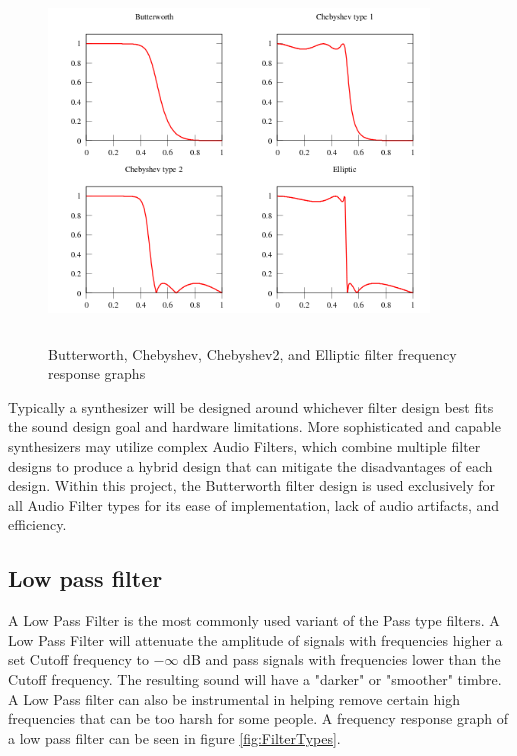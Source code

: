 \documentclass[a4paper,12pt]{report}
\begin{document}
\begin{figure}[h]
    \centering
    \includegraphics[width=0.9\textwidth,height=9.5cm]{FilterDesigns.png}
    \caption{Butterworth, Chebyshev, Chebyshev2, and Elliptic filter frequency response graphs}
    \label{fig:FilterDesigns}
\end{figure}

Typically a synthesizer will be designed around whichever filter design best fits the sound design goal and hardware limitations. More sophisticated and capable synthesizers may utilize complex Audio Filters, which combine multiple filter designs to produce a hybrid design that can mitigate the disadvantages of each design. Within this project, the Butterworth filter design is used exclusively for all Audio Filter types for its ease of implementation, lack of audio artifacts, and efficiency.

\subsection{Low pass filter}
\label{subsec:lowpassfilter}
A Low Pass Filter is the most commonly used variant of the Pass type filters. A Low Pass Filter will attenuate the amplitude of signals with frequencies higher a set Cutoff frequency to $-\infty$ dB and pass signals with frequencies lower than the Cutoff frequency. The resulting sound will have a "darker" or "smoother" timbre. A Low Pass filter can also be instrumental in helping remove certain high frequencies that can be too harsh for some people. A frequency response graph of a low pass filter can be seen in figure \ref{fig:FilterTypes}.
\end{document}
